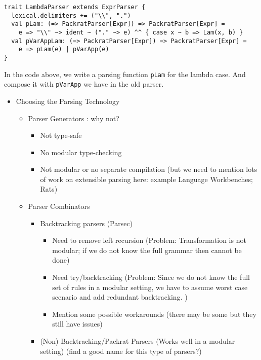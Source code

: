 \begin{lstlisting}
trait LambdaParser extends ExprParser {
  lexical.delimiters += ("\\", ".")
  val pLam: (=> PackratParser[Expr]) => PackratParser[Expr] =
    e => "\\" ~> ident ~ ("." ~> e) ^^ { case x ~ b => Lam(x, b) }
  val pVarAppLam: (=> PackratParser[Expr]) => PackratParser[Expr] =
    e => pLam(e) | pVarApp(e)
}
\end{lstlisting}

In the code above, we write a parsing function \lstinline{pLam} for the lambda case. And compose it with \lstinline{pVarApp} we have in the old parser.

\begin{itemize}
\item Choosing the Parsing Technology
    \begin{itemize}
    \item Parser Generators : why not?
        \begin{itemize}
            \item Not type-safe
            \item No modular type-checking
            \item Not modular or no separate compilation (but we need to mention lots of work on extensible parsing here: example Language Workbenches; Rats)
        \end{itemize}
    \item Parser Combinators
        \begin{itemize}
        \item Backtracking parsers (Parsec)
            \begin{itemize}
            \item Need to remove left recursion (Problem: Transformation is not modular; if we do not know the full grammar then cannot be done)
            \item Need try/backtracking (Problem: Since we do not know the full set of rules in a modular setting, we have to assume worst case scenario and add redundant backtracking. )
            \item Mention some possible workarounds (there may be some but they still have issues)
            \end{itemize}
        \item (Non)-Backtracking/Packrat Parsers (Works well in a modular setting) (find a good name for this type of parsers?)
        \end{itemize}

\end{itemize}
\end{itemize}

